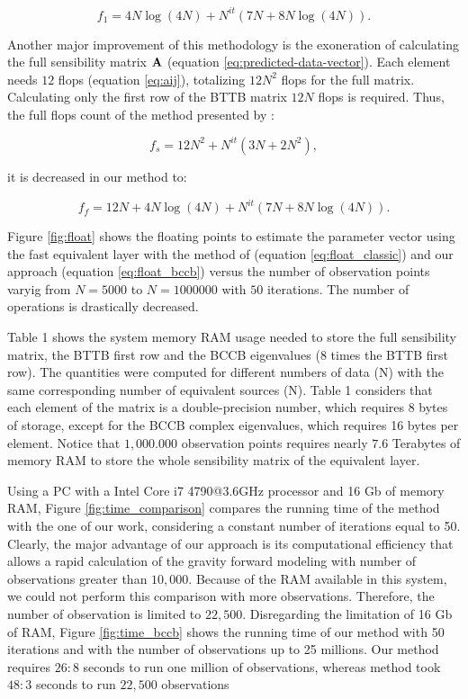 \documentclass[manuscript,revised]{geophysics}
\begin{document}
\begin{equation}
f_1 = 4N\log(4N) + N^{it} (7N + 8N\log(4N)).
\label{eq:float_bccb}
\end{equation}

Another major improvement of this methodology is the exoneration of calculating the full sensibility matrix $\tensor{A}$ (equation \ref{eq:predicted-data-vector}). Each element needs $12$ flops (equation \ref{eq:aij}), totalizing $12N^2$ flops for the full matrix. Calculating only the first row of the BTTB matrix $12N$ flops is required.
Thus, the full flops count of the method presented by \citet{siqueira-etal2017}:

\begin{equation}
f_s = 12N^2 + N^{it} (3N + 2N^2),
\label{eq:float_siqueira}
\end{equation}

it is decreased in our method to:

\begin{equation}
f_f = 12N + 4N \log(4N) + N^{it} (7N + 8N\log(4N)).
\label{eq:float_new}
\end{equation}

Figure \ref{fig:float} shows the floating points to estimate the parameter vector using the fast equivalent layer with the method of \citet{siqueira-etal2017} (equation \ref{eq:float_classic}) and our approach (equation \ref{eq:float_bccb}) versus the number of observation points varyig from $N = 5000$ to $N = 1000000$ with $50$ iterations. The number of operations is drastically decreased.

Table 1 shows the system memory RAM usage needed to store the full sensibility matrix, the BTTB first row and the BCCB eigenvalues ($8$ times the BTTB first row). The quantities were computed for different numbers of data (N) with the same corresponding number of equivalent sources (N). Table 1 considers that each element of the matrix is a double-precision number, which requires 8 bytes of storage, except for the BCCB complex eigenvalues, which requires 16 bytes per element. Notice that $1,000.000$ observation points requires nearly $7.6$ Terabytes of memory RAM to store the whole sensibility matrix of the equivalent layer.

Using a PC with a Intel Core i7 4790@3.6GHz processor and 16 Gb of memory RAM, Figure \ref{fig:time_comparison}  compares the running time  of the  \citet{siqueira-etal2017} method with the one of our work, considering a constant number of iterations equal to 50. Clearly, the major advantage of our approach is its computational efficiency that allows a rapid calculation of the gravity forward modeling  with number of observations greater than $10,000$. Because of the RAM available in this system, we could not perform this comparison with more observations. Therefore, the number of observation is limited to $22,500$. Disregarding the limitation of 16 Gb of RAM, Figure \ref{fig:time_bccb} shows the running time of our method with 50 iterations and with the number of observations up to  25 millions. Our method requires $26:8$ seconds to run one million of observations, whereas \citet{siqueira-etal2017} method took $48:3$ seconds to run $22,500$ observations
\end{document}
